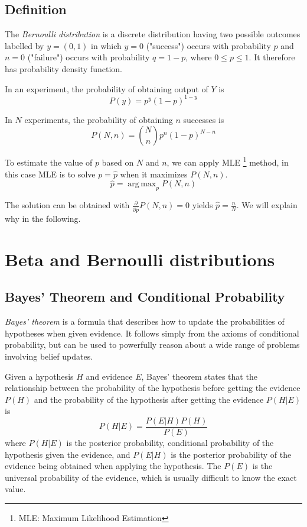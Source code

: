 \documentclass[a4paper]{article}
\DeclareMathOperator*{\argmax}{arg\,max}
\begin{document}
\subsection{Definition}
The \emph{Bernoulli distribution} is a discrete distribution having two possible outcomes labelled by $y=(0, 1)$ in which $y=0$ ("success") occurs with probability $p$ and $n=0$ ("failure") occurs with probability $q=1-p$, where $0 \leq p \leq 1$. It therefore has probability density function.

In an experiment, the probability of obtaining output of $Y$ is
\begin{equation}
    P(y) = p^y (1-p)^{1-y}
\end{equation}

In $N$ experiments, the probability of obtaining $n$ successes is
\begin{equation}
    P(N, n) = \binom{N}{n} p^n (1-p)^{N-n}
\end{equation}

To estimate the value of $p$ based on $N$ and $n$, we can apply MLE \footnote{MLE: Maximum Likelihood Estimation} method, in this case MLE is to solve $p = \hat{p}$ when it maximizes $P(N, n)$.
\begin{equation}
    \hat{p} = \argmax_{p} P(N, n)
\end{equation}

The solution can be obtained with $\frac{\partial}{\partial{\hat{p}}} P(N, n) = 0$ yields $\hat{p} = \frac{n}{N}$.
We will explain why in the following.

\section{Beta and Bernoulli distributions}

\subsection{Bayes' Theorem and Conditional Probability}
\emph{Bayes' theorem} is a formula that describes how to update the probabilities of hypotheses when given evidence. It follows simply from the axioms of conditional probability, but can be used to powerfully reason about a wide range of problems involving belief updates.

Given a hypothesis $H$ and evidence $E$, Bayes' theorem states that the relationship between the probability of the hypothesis before getting the evidence $P(H)$ and the probability of the hypothesis after getting the evidence $P(H|E)$ is
\begin{equation}
    P(H|E) = \frac{P(E|H) P(H)}{P(E)}
\end{equation}
where $P(H|E)$ is the posterior probability, conditional probability of the hypothesis given the evidence, and $P(E|H)$ is the posterior probability of the evidence being obtained when applying the hypothesis.
The $P(E)$ is the universal probability of the evidence, which is usually difficult to know the exact value.
\end{document}
